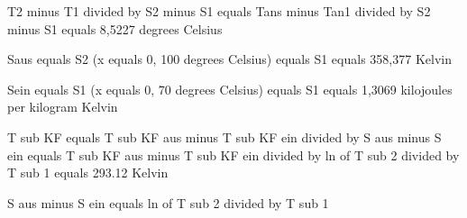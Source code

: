 T2 minus T1 divided by S2 minus S1 equals Tans minus Tan1 divided by S2 minus S1 equals 8,5227 degrees Celsius

Saus equals S2 (x equals 0, 100 degrees Celsius) equals S1 equals 358,377 Kelvin

Sein equals S1 (x equals 0, 70 degrees Celsius) equals S1 equals 1,3069 kilojoules per kilogram Kelvin

T sub KF equals T sub KF aus minus T sub KF ein divided by S aus minus S ein equals T sub KF aus minus T sub KF ein divided by ln of T sub 2 divided by T sub 1 equals 293.12 Kelvin

S aus minus S ein equals ln of T sub 2 divided by T sub 1